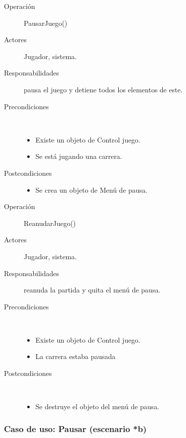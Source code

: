 \begin{description}
    \item [Operación] PausarJuego()
    \item [Actores] Jugador, sistema.
    \item [Responsabilidades] pausa el juego y detiene todos los elementos de este.
    \item [Precondiciones] $\quad$
        \begin{itemize}
            \item Existe un objeto de Control juego.
            \item Se está jugando una carrera.
        \end{itemize}
    \item [Postcondiciones]
        \begin{itemize}
            \item Se crea un objeto de Menú de pausa.
        \end{itemize}
\end{description}

\begin{description}
    \item [Operación] ReanudarJuego()
    \item [Actores] Jugador, sistema.
    \item [Responsabilidades] reanuda la partida y quita el menú de pausa.
    \item [Precondiciones] $\quad$
        \begin{itemize}
            \item Existe un objeto de Control juego.
            \item La carrera estaba pausada
        \end{itemize}
    \item [Postcondiciones] $\quad$
        \begin{itemize}
            \item Se destruye el objeto del menú de pausa.
        \end{itemize}
\end{description}

\subsubsection{Caso de uso: Pausar (escenario *b)}

